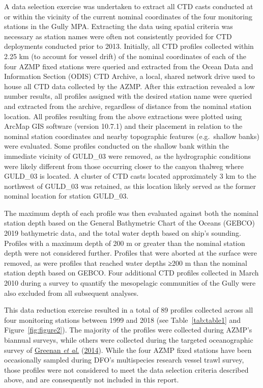 \documentclass[12pt]{article}\usepackage[]{graphicx}\usepackage[]{color}
\begin{document}
A data selection exercise was undertaken to extract all CTD casts conducted at or within the vicinity of the current nominal coordinates of the four monitoring stations in the Gully MPA. Extracting the data using spatial criteria was necessary as station names were often not consistently provided for CTD deployments conducted prior to 2013. Initially, all CTD profiles collected within 2.25 km (to account for vessel drift) of the nominal coordinates of each of the four AZMP fixed stations were queried and extracted from the Ocean Data and Information Section (ODIS) CTD Archive, a local, shared network drive used to house all CTD data collected by the AZMP. After this extraction revealed a low number results, all profiles assigned with the desired station name were queried and extracted from the archive, regardless of distance from the nominal station location. All profiles resulting from the above extractions were plotted using ArcMap GIS software (version 10.7.1) and their placement in relation to the nominal station coordinates and nearby topographic features (e.g.~shallow banks) were evaluated. Some profiles conducted on the shallow bank within the immediate vicinity of GULD\_03 were removed, as the hydrographic conditions were likely different from those occurring closer to the canyon thalweg where GULD\_03 is located. A cluster of CTD casts located approximately 3 km to the northwest of GULD\_03 was retained, as this location likely served as the former nominal location for station GULD\_03.

The maximum depth of each profile was then evaluated against both the nominal station depth based on the General Bathymetric Chart of the Oceans (GEBCO) 2019 bathymetric data, and the total water depth based on ship's sounding. Profiles with a maximum depth of 200 m or greater than the nominal station depth were not considered further. Profiles that were aborted at the surface were removed, as were profiles that reached water depths ≥200 m than the nominal station depth based on GEBCO. Four additional CTD profiles collected in March 2010 during a survey to quantify the mesopelagic communities of the Gully were also excluded from all subsequent analyses.

This data reduction exercise resulted in a total of 89 profiles collected across all four monitoring stations between 1999 and 2018 (see Table~\ref{tab:table1} and Figure~\ref{fig:figure2}). The majority of the profiles were collected during AZMP's biannual surveys, while others were collected during the targeted oceanographic survey of \protect\hyperlink{ref-greenan_2014}{Greenan \textit{et al.}} (\protect\hyperlink{ref-greenan_2014}{2014}). While the four AZMP fixed stations have been occasionally sampled during DFO's multispecies research vessel trawl survey, those profiles were not considered to meet the data selection criteria described above, and are consequently not included in this report.
\end{document}
